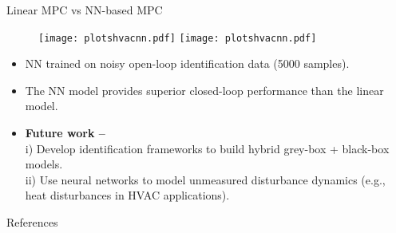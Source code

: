 \documentclass[xcolor=dvipsnames, 8pt]{beamer} %
\begin{document}
\begin{frame}{Linear MPC vs NN-based MPC}
	\begin{figure}[!h]
		\centering
		\texttt{[image: plotshvacnn.pdf]} \hfill
		\texttt{[image: plotshvacnn.pdf]}
	\end{figure}
	\begin{itemize}
		\item NN trained on noisy open-loop identification data (5000 samples).
		\item The NN model provides superior closed-loop performance than the linear model.
		\item \textbf{Future work --} \\
		i) Develop identification frameworks to build
		hybrid grey-box + black-box models. \\
		ii) Use neural networks to model unmeasured disturbance dynamics (e.g., heat disturbances in HVAC applications).
	\end{itemize}
\end{frame}

\begin{frame}{References}


\end{frame}
\end{document}
